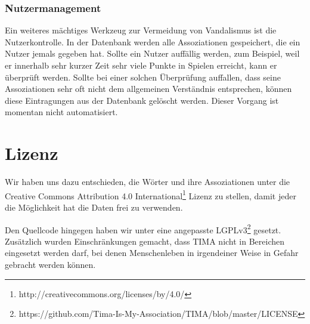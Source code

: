\subsubsection{Nutzermanagement}
Ein weiteres mächtiges Werkzeug zur Vermeidung von Vandalismus ist die
Nutzerkontrolle. In der Datenbank werden alle Assoziationen gespeichert, die
ein Nutzer jemals gegeben hat. Sollte ein Nutzer auffällig werden, zum
Beispiel, weil er innerhalb sehr kurzer Zeit sehr viele Punkte in Spielen
erreicht, kann er überprüft werden. Sollte bei einer solchen Überprüfung
auffallen, dass seine Assoziationen sehr oft nicht dem allgemeinen Verständnis
entsprechen, können diese Eintragungen aus der Datenbank gelöscht werden.
Dieser Vorgang ist momentan nicht automatisiert.

\section{Lizenz}
Wir haben uns dazu entschieden, die Wörter und ihre Assoziationen unter die Creative Commons Attribution 4.0 International\footnote{http://creativecommons.org/licenses/by/4.0/} Lizenz zu stellen, damit jeder die Möglichkeit hat die Daten frei zu verwenden.

Den Quellcode hingegen haben wir unter eine angepasste LGPLv3\footnote{https://github.com/Tima-Is-My-Association/TIMA/blob/master/LICENSE} gesetzt. Zusätzlich wurden Einschränkungen gemacht, dass TIMA nicht in Bereichen eingesetzt werden darf, bei denen Menschenleben in irgendeiner Weise in Gefahr gebracht werden können.
